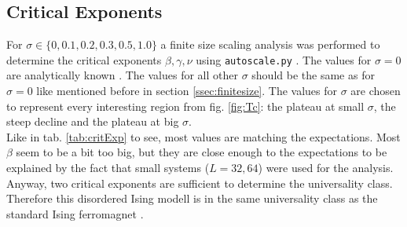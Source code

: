 \subsection{Critical Exponents}
    For \(\sigma \in \{0,0.1,0.2,0.3,0.5,1.0\}\) a finite size scaling analysis was
    performed to determine the critical exponents \(\beta, \gamma, \nu\)
    using \texttt{autoscale.py} \cite{autoscale2009}. The values for
    \(\sigma = 0\) are analytically known \cite{Pelissetto2002}. The
    values for all other \(\sigma\) should be the same as for \(\sigma = 0\)
    like mentioned before in section \ref{ssec:finitesize}.
    The values for \(\sigma\) are chosen to represent every interesting
    region from fig. \ref{fig:Tc}:
    the plateau at small \(\sigma\), the steep decline and the plateau at
    big \(\sigma\).\\
    Like in tab. \ref{tab:critExp} to see, most values
    are matching the expectations. Most \(\beta\) seem to be a bit too
    big, but they are close enough to the expectations to be explained
    by the fact that small systems (\(L=32,64\)) were used for the
    analysis.
    Anyway, two critical exponents are sufficient to determine the universality
    class. Therefore this disordered Ising modell is in the same universality
    class as the standard Ising ferromagnet \cite[p. 145]{Katzgraber2011}.
